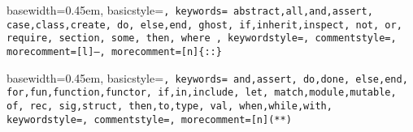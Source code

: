 { basewidth=0.45em,
  basicstyle=\small\tt,
  keywords={
    abstract,all,and,assert,
    case,class,create,
    do,
    else,end,
    ghost,
    if,inherit,inspect,
    not,
    or,
    require,
    section,
    some,
    then,
    where
  },
  keywordstyle=\color{blue},
  commentstyle=\color{brown},
  morecomment=[l]{--},
  morecomment=[n]{\{:}{:\}}
}

 {\lstset{language=alba}} {}







{ basewidth=0.45em,
  basicstyle=\tt\small,
  keywords={
    and,assert,
    do,done,
    else,end,
    for,fun,function,functor,
    if,in,include,
    let,
    match,module,mutable,
    of,
    rec,
    sig,struct,
    then,to,type,
    val,
    when,while,with},
  keywordstyle=\color{blue},
  commentstyle=\color{brown},
  morecomment=[n]{(*}{*)}
}

 {\lstset{language=ocaml}} {}



